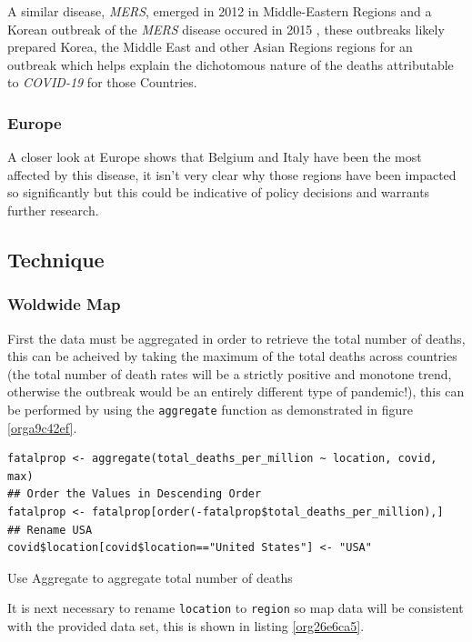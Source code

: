 \documentclass[11pt]{article}
\begin{document}
A similar disease, \emph{MERS}, emerged in 2012 in Middle-Eastern Regions
\cite{woodley2020} and a Korean outbreak of the \emph{MERS} disease occured in 2015
\cite{serrano2015}, these outbreaks likely prepared Korea, the Middle East and
other Asian Regions regions for an outbreak which helps explain the dichotomous
nature of the deaths attributable to \emph{COVID-19} for those Countries.

\subsubsection{Europe}
\label{sec:orgc5e9a94}
A closer look at Europe shows that Belgium and Italy have been the most affected
by this disease, it isn't very clear why those regions have been impacted so
significantly but this could be indicative of policy decisions and warrants
further research.

\subsection{Technique}
\label{sec:orga71b4b8}
\subsubsection{Woldwide Map}
\label{sec:org2387bb0}
First the data must be aggregated in order to retrieve the total number of
deaths, this can be acheived by taking the maximum of the total deaths across
countries (the total number of death rates will be a strictly positive and
monotone trend, otherwise the outbreak would be an entirely different type of
pandemic!), this can be performed by using the \texttt{aggregate} function as
demonstrated in figure \ref{orga9c42ef}.

\begin{listing}[htbp]
\begin{verbatim}
fatalprop <- aggregate(total_deaths_per_million ~ location, covid, max)
## Order the Values in Descending Order
fatalprop <- fatalprop[order(-fatalprop$total_deaths_per_million),]
## Rename USA
covid$location[covid$location=="United States"] <- "USA"
\end{verbatim}
\caption{\label{orga9c42ef}Use Aggregate to aggregate total number of deaths}
\end{listing}


It is next necessary to rename \texttt{location} to \texttt{region} so map data will be
consistent with the provided data set, this is shown in listing \ref{org26e6ca5}.
\end{document}
